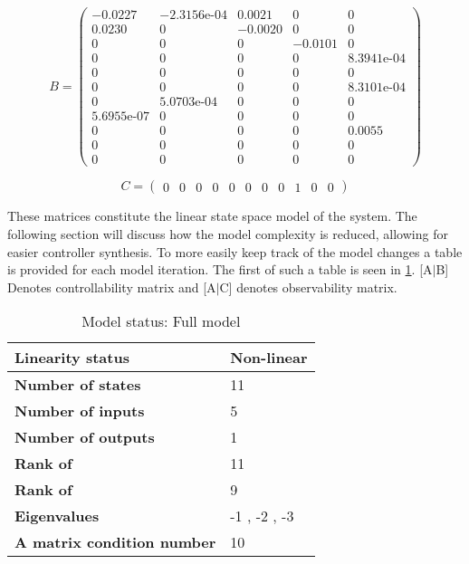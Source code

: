 \medskip

\begin{equation}  \label{eq:B_full}
	B = \left(\begin{array}{ccccc}
		-0.0227 & -\text{2.3156e-04} & 0.0021 & 0 & 0\\
		0.0230 & 0 & -0.0020 & 0 & 0\\
		0 & 0 & 0 & -0.0101 & 0\\
		0 & 0 & 0 & 0 & \text{8.3941e-04}\\
		0 & 0 & 0 & 0 & 0\\
		0 & 0 & 0 & 0 & \text{8.3101e-04}\\
		0 & \text{5.0703e-04} & 0 & 0 & 0\\
		\text{5.6955e-07} & 0 & 0 & 0 & 0\\
		0 & 0 & 0 & 0 & 0.0055\\
		0 & 0 & 0 & 0 & 0\\
		0 & 0 & 0 & 0 & 0
	\end{array}\right)
\end{equation}

\medskip

\begin{equation}  \label{eq:C_full}
	C = \left(\begin{array}{ccccccccccc}
		0 & 0 & 0 & 0 & 0 & 0 & 0 & 0 & 1 & 0 & 0
	\end{array}\right)
\end{equation}

These matrices constitute the linear state space model of the system. The following section will discuss how the model complexity is reduced, allowing for easier controller synthesis. To more easily keep track of the model changes a table is provided for each model iteration. The first of such a table is seen in \cref{tab:model_full}. [A$|$B] Denotes controllability matrix and [A$|$C] denotes observability matrix.





\begin{table}[h]
	\centering
	\caption{Model status: Full model}
	\label{tab:model_full}
	\begin{tabular}{ll}

		\textbf{Linearity status}          & Non-linear   \\ \toprule
		\textbf{Number of states}          & 11           \\
		\textbf{Number of inputs}          & 5            \\
		\textbf{Number of outputs}         & 1            \\ \toprule
		\textbf{Rank of \text{[A$|$B]}}                & 11           \\
		\textbf{Rank of \text{[A$|$C]}}                & 9            \\
		\textbf{Eigenvalues}               & -1 , -2 , -3 \\
		\textbf{A matrix condition number} & 10           \\
	\end{tabular}
\end{table}

